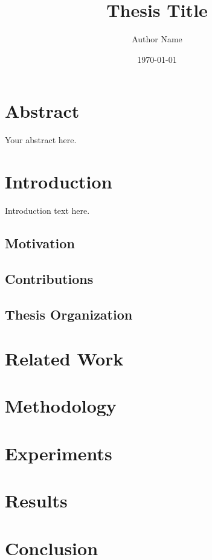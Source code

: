 \documentclass[a4paper,12pt,twoside,english]{book}
\title{Thesis Title}
\author{Author Name}
\date{\today}
\theoremstyle{plain}
\theoremstyle{definition}
\theoremstyle{remark}
\begin{document}
\frontmatter
\maketitle

\chapter*{Abstract}
Your abstract here.

\tableofcontents
\listoffigures
\listoftables

\mainmatter

\chapter{Introduction}
\label{ch:introduction}

Introduction text here.

\section{Motivation}
\label{sec:motivation}

\section{Contributions}
\label{sec:contributions}

\section{Thesis Organization}
\label{sec:organization}

\chapter{Related Work}
\label{ch:related}

\chapter{Methodology}
\label{ch:methodology}

\chapter{Experiments}
\label{ch:experiments}

\chapter{Results}
\label{ch:results}

\chapter{Conclusion}
\label{ch:conclusion}

\backmatter

\printbibliography
\end{document}
